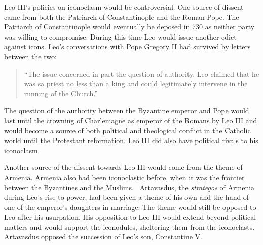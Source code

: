 \documentclass[12pt]{article}
\begin{document}
    Leo III's policies on iconoclasm would be controversial. One source of dissent came from both the Patriarch of Constantinople and the Roman Pope. The Patriarch of Constantinople would eventually be deposed in 730 as neither party was willing to compromise. During this time Leo would issue another edict against icons. Leo's conversations with Pope Gregory II had survived by letters between the two: \begin{quote}
        ``The issue concerned in part the question of authority. Leo claimed that he was sa priest no less than a king and could legitimately intervene in the running of the Church.''~\cite[p. 52]{LeoJour}
    \end{quote}\noindent
    The question of the authority between the Byzantine emperor and Pope would last until the crowning of Charlemagne as emperor of the Romans by Leo III and would become a source of both political and theological conflict in the Catholic world until the Protestant reformation. Leo III did also have political rivals to his iconoclasm.

    Another source of the dissent towards Leo III would come from the theme of Armenia. Armenia also had been iconoclastic before, when it was the frontier between the Byzantines and the Muslims.~\cite[p. 58]{LeoJour} Artavasdus, the \emph{strategos} of Armenia during Leo's rise to power, had been given a theme of his own and the hand of one of the emperor's daughters in marriage. The theme would still be opposed to Leo after his usurpation. His opposition to Leo III would extend beyond political matters and would support the iconodules, sheltering them from the iconoclasts. Artavasdus opposed the succession of Leo's son, Constantine V. \
\end{document}
